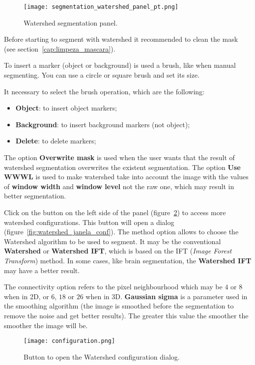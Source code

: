 \begin{figure}[!htb]
\centering
\texttt{[image: segmentation\_watershed\_panel\_pt.png]}
\caption{Watershed segmentation panel.}
\label{fig:watershed_painel}
\end{figure}

Before starting to segment with watershed it recommended to clean the mask (see section~\ref{cap:limpeza_mascara}).

To insert a marker (object or background) is used a brush, like when manual segmenting. You can use a circle or square brush and set its size.

It necessary to select the brush operation, which are the following:
\begin{itemize}
    \item \textbf{Object}: to insert object markers;
    \item \textbf{Background}: to insert background markers (not object);
    \item \textbf{Delete}: to delete markers;
\end{itemize}


The option \textbf{Overwrite mask} is used when the user wants that the result of watershed segmentation overwrites the existent segmentation. The option \textbf{Use WWWL} is used to make watershed take into account the image with the values of \textbf{window width} and \textbf{window level} not the raw one, which may result in better segmentation.

Click on the button on the left side of the panel (figure~\ref{fig:watershed_conf}) to access more watershed configurations. This button will open a dialog (figure~\ref{fig:watershed_janela_conf}). The method option allows to choose the Watershed algorithm to be used to segment. It may be the conventional \textbf{Watershed} or \textbf{Watershed IFT}, which is based on the IFT (\textit{Image Forest Transform}) method. In some cases, like brain segmentation, the \textbf{Watershed IFT} may have a better result.

The connectivity option refers to the pixel neighbourhood which may be $4$ or $8$ when in 2D,  or $6$, $18$ or $26$ when in 3D. \textbf{Gaussian sigma} is a parameter used in the smoothing algorithm (the image is smoothed before the segmentation to remove the noise and get better results). The greater this value the smoother the smoother the image will be.

\begin{figure}[!htb]
    \centering
    \texttt{[image: configuration.png]}
    \caption{Button to open the Watershed configuration dialog.}
    \label{fig:watershed_conf}
\end{figure}

